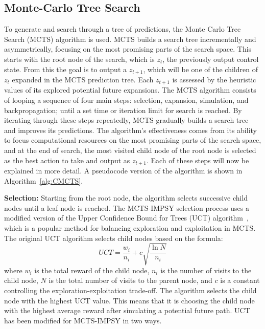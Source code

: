 \subsection{Monte-Carlo Tree Search}
To generate and search through a tree of predictions, the Monte Carlo Tree Search (MCTS) algorithm is used. MCTS builds a search tree incrementally and asymmetrically, focusing on the most promising parts of the search space. This starts with the root node of the search, which is $z_t$, the previously output control state. From this the goal is to output a $z_{t+1}$, which will be one of the children of $z_t$ expanded in the MCTS prediction tree. Each $z_{t+1}$ is assessed by the heuristic values of its explored potential future expansions. 
The MCTS algorithm consists of looping a sequence of four main steps: selection, expansion, simulation, and backpropagation; until a set time or iteration limit for search is reached. By iterating through these steps repeatedly, MCTS gradually builds a search tree and improves its predictions. The algorithm's effectiveness comes from its ability to focus computational resources on the most promising parts of the search space, and at the end of search, the most visited child node of the root node is selected as the best action to take and output as $z_{t+1}$. Each of these steps will now be explained in more detail. A pseudocode version of the algorithm is shown in Algorithm~\ref{alg:CMCTS}.

\textbf{Selection:}
Starting from the root node, the algorithm selects successive child nodes until a leaf node is reached. The MCTS-IMPSY selection process uses a modified version of the Upper Confidence Bound for Trees (UCT) algorithm~\citep{Kocsis2006UCT}, which is a popular method for balancing exploration and exploitation in MCTS. The original UCT algorithm selects child nodes based on the formula:
\begin{equation}
    UCT = \frac{w_i}{n_i} + c\sqrt{\frac{\ln{N}}{n_i}}
\end{equation}
where $w_i$ is the total reward of the child node, $n_i$ is the number of visits to the child node, $N$ is the total number of visits to the parent node, and $c$ is a constant controlling the exploration-exploitation trade-off. The algorithm selects the child node with the highest UCT value. This means that it is choosing the child node with the highest average reward after simulating a potential future path. UCT has been modified for MCTS-IMPSY in two ways.

